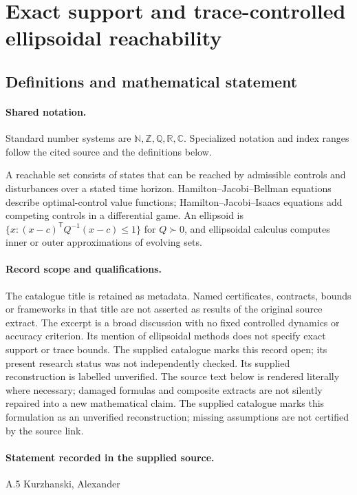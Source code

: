 \documentclass[11pt]{article}
\begin{document}
\section{Exact support and trace-controlled ellipsoidal reachability}\label{statement}

\subsection{Definitions and mathematical statement}

\paragraph{Shared notation.}Standard number systems are $\mathbb N,\mathbb Z,\mathbb Q,\mathbb R,\mathbb C$. Specialized notation and index ranges follow the cited source and the definitions below.


A reachable set consists of states that can be reached by admissible controls and disturbances over a stated time horizon. Hamilton--Jacobi--Bellman equations describe optimal-control value functions; Hamilton--Jacobi--Isaacs equations add competing controls in a differential game. An ellipsoid is $\{x:(x-c)^{\mathsf T}Q^{-1}(x-c)\leq1\}$ for $Q\succ0$, and ellipsoidal calculus computes inner or outer approximations of evolving sets.
\paragraph{Record scope and qualifications.}
The catalogue title is retained as metadata. Named certificates, contracts, bounds or frameworks in that title are not asserted as results of the original source extract.
The excerpt is a broad discussion with no fixed controlled dynamics or accuracy criterion. Its mention of ellipsoidal methods does not specify exact support or trace bounds. The supplied catalogue marks this record open; its present research status was not independently checked. Its supplied reconstruction is labelled unverified.
The source text below is rendered literally where necessary; damaged formulas and composite extracts are not silently repaired into a new mathematical claim.
The supplied catalogue marks this formulation as an unverified reconstruction; missing assumptions are not certified by the source link.
\paragraph{Statement recorded in the supplied source.}
A.5 Kurzhanski, Alexander
\end{document}
